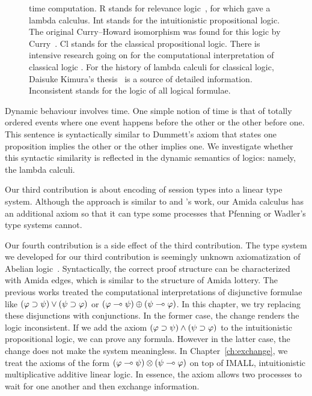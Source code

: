 \begin{figure}
{{  time computation.
  \textsf{R} stands for relevance logic~\citep{urquhart1972},
  for which \citet{gabbay1992} gave a lambda calculus.
  \textsf{Int} stands for the intuitionistic propositional logic.
  The original Curry--Howard isomorphism was found for this logic by
  Curry~\citep{curry1942}.
  \textsf{Cl} stands for the classical propositional logic.
  There is intensive research going on for the computational
  interpretation of classical logic \citep{lambdamu,filinski1989,griffin1990,ong-stewart,selinger2001,kakutani2002,curien2000,wadler-dual, wadler-reloaded}.
  For the history of lambda calculi for classical logic,
  Daisuke Kimura's thesis~\cite{kimura} is a source of detailed
  information.
  \textsf{Inconsistent} stands for the logic of all logical formulae.}
  }
  \label{fig:lattice}
 \end{figure}
Dynamic behaviour involves time.
One simple notion of time is that of totally ordered events where
one event happens before the other or the other before one.
This sentence is syntactically similar to Dummett's axiom that states
one proposition implies the other or the other implies one.
We investigate whether this syntactic similarity is reflected
in the dynamic semantics of logics: namely, the lambda calculi.

Our third contribution is about encoding of session types into a linear
type system.  Although the approach is similar to \citet{pfenning2010} and
\citet{wadler2012propositions}'s work, our Amida calculus has an
additional axiom so that it can type some processes that Pfenning or
Wadler's type systems cannot.

Our fourth contribution is a side effect of the third contribution.
The type system we developed for our third contribution is seemingly
unknown axiomatization of Abelian logic~\citep{casari1989}.
Syntactically, the correct proof structure can be characterized with
Amida edges, which is similar to the structure of Amida lottery.
The previous works treated the computational interpretations of
disjunctive formulae like $(\varphi\supset\psi)\lor(\psi\supset\varphi)$ or
$(\varphi\multimap\psi)\oplus(\psi\multimap\varphi)$.  In this chapter, we try
replacing these disjunctions with conjunctions.
In the former case, the change renders the logic inconsistent.
If we add the axiom $(\varphi\supset\psi)\land(\psi\supset\varphi)$ to the
intuitionistic propositional logic,
we can prove any formula.  However in the latter case, the change does
not make the system meaningless.
In Chapter~\ref{ch:exchange}, we treat
the axioms of the form $(\varphi\multimap\psi)\otimes(\psi\multimap\varphi)$
on top of IMALL, intuitionistic
multiplicative additive linear
logic.  In essence, the axiom allows two processes to wait for one
another and then exchange information.

